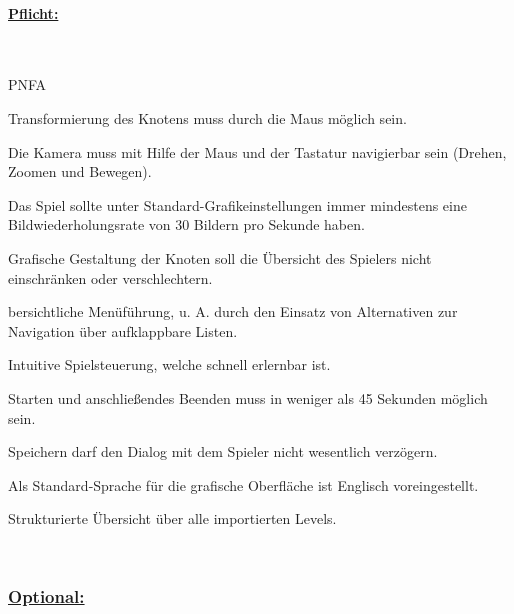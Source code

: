 %
%


%
%
\renewcommand{\K}{}


%
%
\paragraph*{\underline{Pflicht:}}~\\

\begin{ids}{\gls{PNFA\K}} 

 	\id[10] Transformierung des Knotens muss durch die Maus möglich sein.
 	
 	\id[20] Die Kamera muss mit Hilfe der Maus und der Tastatur navigierbar sein (Drehen, Zoomen und Bewegen).
 	
 	\id[30] Das Spiel sollte unter Standard-Grafikeinstellungen immer mindestens eine Bildwiederholungsrate von 30 Bildern pro Sekunde haben.
 	
 	\id[40] Grafische Gestaltung der Knoten soll die Übersicht des Spielers nicht einschränken oder verschlechtern.
 	
 	bersichtliche Menüführung, u. A. durch den Einsatz von Alternativen zur Navigation über aufklappbare Listen.
 	
  	\id[60] Intuitive Spielsteuerung, welche schnell erlernbar ist.
  	
  	\id[70] Starten und anschließendes Beenden muss in weniger als 45 Sekunden möglich sein.
  	
  	\id[80] Speichern darf den Dialog mit dem Spieler nicht wesentlich verzögern.
  	
  	\id[90] Als Standard-Sprache für die grafische Oberfläche ist Englisch voreingestellt.
  	
  	\id[100] Strukturierte Übersicht über alle importierten Levels.
	
\end{ids}

~\\


%
%
\subsubsection*{\underline{Optional:}}~\\


